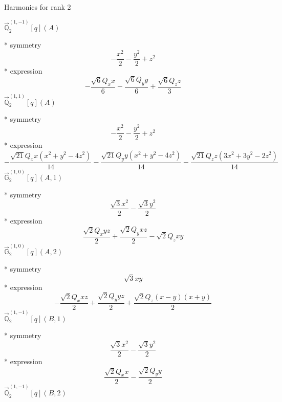 \documentclass[fleqn,8pt]{jsarticle}
\begin{document}
\noindent * Harmonics for rank 2

\noindent\quad $\vec{\mathbb{Q}}_{2}^{(1,-1)}[q](A)$

\noindent\quad ** symmetry
\begin{dmath*}
- \frac{x^{2}}{2} - \frac{y^{2}}{2} + z^{2}
\end{dmath*}
\noindent\quad ** expression
\begin{dmath*}
- \frac{\sqrt{6} Q_{x} x}{6} - \frac{\sqrt{6} Q_{y} y}{6} + \frac{\sqrt{6} Q_{z} z}{3}
\end{dmath*}
\noindent\quad $\vec{\mathbb{Q}}_{2}^{(1,1)}[q](A)$

\noindent\quad ** symmetry
\begin{dmath*}
- \frac{x^{2}}{2} - \frac{y^{2}}{2} + z^{2}
\end{dmath*}
\noindent\quad ** expression
\begin{dmath*}
- \frac{\sqrt{21} Q_{x} x \left(x^{2} + y^{2} - 4 z^{2}\right)}{14} - \frac{\sqrt{21} Q_{y} y \left(x^{2} + y^{2} - 4 z^{2}\right)}{14} - \frac{\sqrt{21} Q_{z} z \left(3 x^{2} + 3 y^{2} - 2 z^{2}\right)}{14}
\end{dmath*}
\noindent\quad $\vec{\mathbb{G}}_{2}^{(1,0)}[q](A,1)$

\noindent\quad ** symmetry
\begin{dmath*}
\frac{\sqrt{3} x^{2}}{2} - \frac{\sqrt{3} y^{2}}{2}
\end{dmath*}
\noindent\quad ** expression
\begin{dmath*}
\frac{\sqrt{2} Q_{x} y z}{2} + \frac{\sqrt{2} Q_{y} x z}{2} - \sqrt{2} Q_{z} x y
\end{dmath*}
\noindent\quad $\vec{\mathbb{G}}_{2}^{(1,0)}[q](A,2)$

\noindent\quad ** symmetry
\begin{dmath*}
\sqrt{3} x y
\end{dmath*}
\noindent\quad ** expression
\begin{dmath*}
- \frac{\sqrt{2} Q_{x} x z}{2} + \frac{\sqrt{2} Q_{y} y z}{2} + \frac{\sqrt{2} Q_{z} \left(x - y\right) \left(x + y\right)}{2}
\end{dmath*}
\noindent\quad $\vec{\mathbb{Q}}_{2}^{(1,-1)}[q](B,1)$

\noindent\quad ** symmetry
\begin{dmath*}
\frac{\sqrt{3} x^{2}}{2} - \frac{\sqrt{3} y^{2}}{2}
\end{dmath*}
\noindent\quad ** expression
\begin{dmath*}
\frac{\sqrt{2} Q_{x} x}{2} - \frac{\sqrt{2} Q_{y} y}{2}
\end{dmath*}
\noindent\quad $\vec{\mathbb{Q}}_{2}^{(1,-1)}[q](B,2)$
\end{document}
